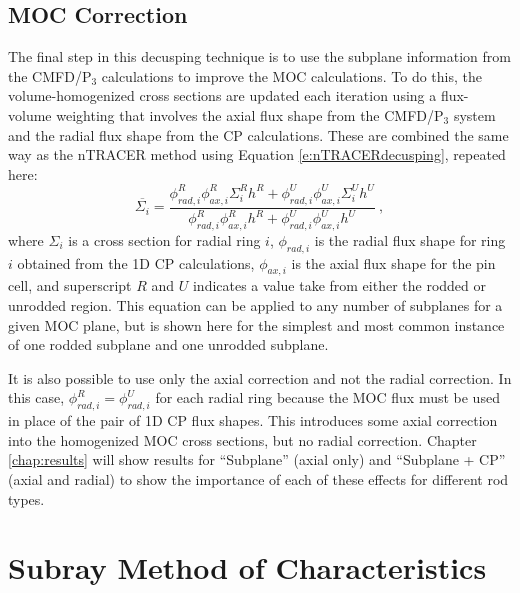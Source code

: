 \subsection{MOC Correction}

The final step in this decusping technique is to use the subplane information from the CMFD/P$_3$ calculations to improve the MOC calculations.  To do this, the volume-homogenized cross sections are updated each iteration using a flux-volume weighting that involves the axial flux shape from the CMFD/P$_3$ system and the radial flux shape from the CP calculations.  These are combined the same way as the nTRACER method using Equation \ref{e:nTRACERdecusping}, repeated here:
\begin{equation}
\overline{\Sigma_i} = \frac{\phi_{rad,i}^R \phi_{ax,i}^R \Sigma_i^R h^R + \phi_{rad,i}^U \phi_{ax,i}^U \Sigma_i^U h^U}{\phi_{rad,i}^R \phi_{ax,i}^R h^R + \phi_{rad,i}^U \phi_{ax,i}^U h^U}\ , \nonumber
\end{equation}
where $\Sigma_i$ is a cross section for radial ring $i$, $\phi_{rad,i}$ is the radial flux shape for ring $i$ obtained from the 1D CP calculations, $\phi_{ax,i}$ is the axial flux shape for the pin cell, and superscript $R$ and $U$ indicates a value take from either the rodded or unrodded region.  This equation can be applied to any number of subplanes for a given MOC plane, but is shown here for the simplest and most common instance of one rodded subplane and one unrodded subplane.

It is also possible to use only the axial correction and not the radial correction.  In this case, $\phi_{rad,i}^R = \phi_{rad,i}^U$ for each radial ring because the MOC flux must be used in place of the pair of 1D CP flux shapes.  This introduces some axial correction into the homogenized MOC cross sections, but no radial correction.  Chapter \ref{chap:results} will show results for ``Subplane'' (axial only) and ``Subplane + CP'' (axial and radial) to show the importance of each of these effects for different rod types.

\section{Subray Method of Characteristics}

